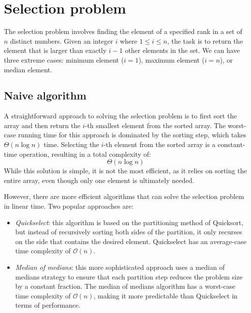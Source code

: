 \section{Selection problem}

The selection problem involves finding the element of a specified rank in a set of $n$ distinct numbers.
Given an integer $i$ where $1\leq i \leq n$, the task is to return the element that is larger than exactly $i-1$ other elements in the set.
We can have three extreme cases: minimum element ($i=1$), maximum element ($i=n$), or median element. 

\subsection{Naive algorithm}
A straightforward approach to solving the selection problem is to first sort the array and then return the $i$-th smallest element from the sorted array.
The worst-case running time for this approach is dominated by the sorting step, which takes $\Theta(n\log n)$ time. 
Selecting the $i$-th element from the sorted array is a constant-time operation, resulting in a total complexity of:
\[\Theta(n\log n)\]
While this solution is simple, it is not the most efficient, as it relies on sorting the entire array, even though only one element is ultimately needed.

However, there are more efficient algorithms that can solve the selection problem in linear time. 
Two popular approaches are:
\begin{itemize}
    \item \textit{Quickselect}: this algorithm is based on the partitioning method of Quicksort, but instead of recursively sorting both sides of the partition, it only recurses on the side that contains the desired element.
        Quickselect has an average-case time complexity of $\mathcal{O}(n)$. 
    \item \textit{Median of medians}: this more sophisticated approach uses a median of medians strategy to ensure that each partition step reduces the problem size by a constant fraction.
        The median of medians algorithm has a worst-case time complexity of $\mathcal{O}(n)$, making it more predictable than Quickselect in terms of performance.
\end{itemize}

